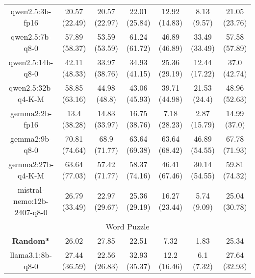 \begin{table}[]
{\begin{tabular}{ccccccc}
        \multicolumn{1}{c|}{qwen2.5:3b-fp16} & 20.57 (22.49) & 20.57 (22.97) & \multicolumn{1}{c|}{22.01 (25.84)} & 12.92 (14.83) & \multicolumn{1}{c|}{8.13 (9.57)} & 21.05 (23.76) \\
        

        \multicolumn{1}{c|}{qwen2.5:7b-q8-0} & 57.89 (58.37) & 53.59 (53.59) & \multicolumn{1}{c|}{61.24 (61.72)} & 46.89 (46.89) & \multicolumn{1}{c|}{33.49 (33.49)} & 57.58 (57.89) \\
        

        \multicolumn{1}{c|}{qwen2.5:14b-q8-0} & 42.11 (48.33) & 33.97 (38.76) & \multicolumn{1}{c|}{34.93 (41.15)} & 25.36 (29.19) & \multicolumn{1}{c|}{12.44 (17.22)} & 37.0 (42.74) \\
        

        \multicolumn{1}{c|}{qwen2.5:32b-q4-K-M} & 58.85 (63.16) & 44.98 (48.8) & \multicolumn{1}{c|}{43.06 (45.93)} & 39.71 (44.98) & \multicolumn{1}{c|}{21.53 (24.4)} & 48.96 (52.63) \\
        

        \multicolumn{1}{c|}{gemma2:2b-fp16} & 13.4 (38.28) & 14.83 (33.97) & \multicolumn{1}{c|}{16.75 (38.76)} & 7.18 (28.23) & \multicolumn{1}{c|}{2.87 (15.79)} & 14.99 (37.0) \\
        

        \multicolumn{1}{c|}{gemma2:9b-q8-0} & 70.81 (74.64) & 68.9 (71.77) & \multicolumn{1}{c|}{63.64 (69.38)} & 63.64 (68.42) & \multicolumn{1}{c|}{46.89 (54.55)} & 67.78 (71.93) \\
        

        \multicolumn{1}{c|}{gemma2:27b-q4-K-M} & 63.64 (77.03) & 57.42 (71.77) & \multicolumn{1}{c|}{58.37 (74.16)} & 46.41 (67.46) & \multicolumn{1}{c|}{30.14 (54.55)} & 59.81 (74.32) \\
        

        \multicolumn{1}{c|}{mistral-nemo:12b-2407-q8-0} & 26.79 (33.49) & 22.97 (29.67) & \multicolumn{1}{c|}{25.36 (29.19)} & 16.27 (23.44) & \multicolumn{1}{c|}{5.74 (9.09)} & 25.04 (30.78) \\
        
\hline
\multicolumn{7}{c}{Word Puzzle} \\ \hline
\multicolumn{1}{c|}{\textbf{Random*}} & 26.02 & 27.85 & \multicolumn{1}{c|}{22.51} & 7.32 & \multicolumn{1}{c|}{1.83} & 25.34 \\ \hline

        \multicolumn{1}{c|}{llama3.1:8b-q8-0} & 27.44 (36.59) & 22.56 (26.83) & \multicolumn{1}{c|}{32.93 (35.37)} & 12.2 (16.46) & \multicolumn{1}{c|}{6.1 (7.32)} & 27.64 (32.93) \\
        


\end{tabular}}
\end{table}

